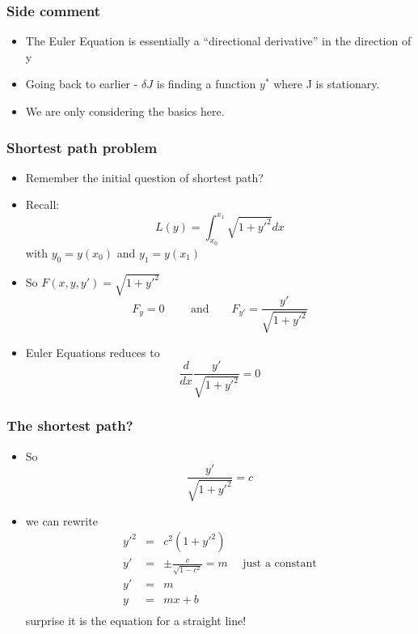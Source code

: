 \documentclass[10pt]{beamer}
\begin{document}
\begin{frame}
  \frametitle{Side comment}
  \begin{itemize}
  \item The Euler Equation is essentially a ``directional derivative''
    in the direction of y
  \item Going back to earlier - $\delta J$ is finding a function $y^*$
    where J is stationary. 
  \item We are only considering the basics here. 
  \end{itemize}
\end{frame}

\begin{frame}
  \frametitle{Shortest path problem}
  \begin{itemize}
  \item Remember the initial question of shortest path? 
  \item Recall:
    \[
      L(y) = \int_{x_0}^{x_1} \sqrt{1 + y'^2} dx
    \] with $y_0 = y(x_0)$ and $y_1 = y(x_1)$
  \item So $F(x, y, y') = \sqrt{1 + y'^2}$
    \[
      F_y = 0 \mbox{~~~~~~ and ~~~~~} F_{y'} = \frac{y'}{\sqrt{1+y'^2}}
    \]    
  \item Euler Equations reduces to
    \[
      \frac{d}{dx} \frac{y'}{ \sqrt{1+y'^2} } = 0
    \]
  \end{itemize}
\end{frame}

\begin{frame}
  \frametitle{The shortest path?}
  \begin{itemize}
  \item So 
    \[
      \frac{ y' }{ \sqrt{1+y'^2} } = c
    \]
  \item we can rewrite
    \[
      \begin{array}{rcl}
        y'^2& = & c^2 (1+y'^2)\\ 
        y'  & = & \pm \frac{c}{\sqrt{1-c^2}} = m \mbox{ ~~ just a constant} \\ 
        y'  & = & m\\ 
        y   & = & mx + b \\ 
      \end{array}
    \]
    surprise it is the equation for a straight line!
    
  \end{itemize}
\end{frame}
\end{document}
